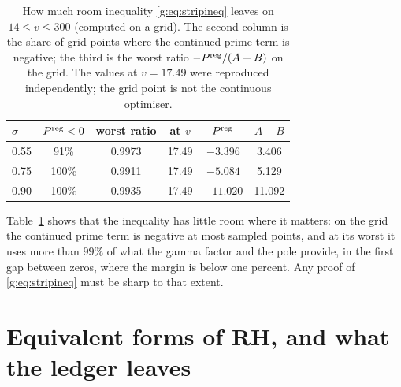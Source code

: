 \begin{table}[t]
\centering
\footnotesize
\begin{tabular}{lccccc}
\toprule
$\sigma$ & $P^{\rm reg}<0$ & worst ratio & at $v$ & $P^{\rm reg}$ & $A+B$\\
\midrule
0.55 & 91\% & 0.9973 & 17.49 & $-3.396$ & 3.406\\
0.75 & 100\% & 0.9911 & 17.49 & $-5.084$ & 5.129\\
0.90 & 100\% & 0.9935 & 17.49 & $-11.020$ & 11.092\\
\bottomrule
\end{tabular}
\caption{How much room inequality \eqref{g:eq:stripineq} leaves on $14\le v\le300$ (computed on a grid). The second column is the share of grid points where the continued prime term is negative; the third is the worst ratio $-P^{\rm reg}/(A+B)$ on the grid. The values at $v=17.49$ were reproduced independently; the grid point is not the continuous optimiser.}
\label{g:tab:strip}
\end{table}

Table~\ref{g:tab:strip} shows that the inequality has little room where it matters: on the grid the continued prime term is negative at most sampled points, and at its worst it uses more than $99\%$ of what the gamma factor and the pole provide, in the first gap between zeros, where the margin is below one percent. Any proof of \eqref{g:eq:stripineq} must be sharp to that extent.

\section{Equivalent forms of RH, and what the ledger leaves}\label{g:sec:chain}

